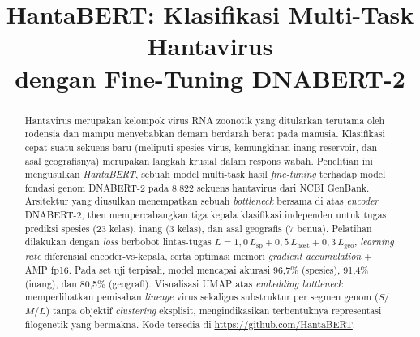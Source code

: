 \documentclass[conference]{IEEEtran}
\begin{document}
\title{HantaBERT: Klasifikasi Multi-Task Hantavirus\\dengan Fine-Tuning DNABERT-2}

\author{%
}

\maketitle

\begin{abstract}
Hantavirus merupakan kelompok virus RNA zoonotik yang ditularkan terutama
oleh rodensia dan mampu menyebabkan demam berdarah berat pada manusia.
Klasifikasi cepat suatu sekuens baru (meliputi spesies virus, kemungkinan
inang reservoir, dan asal geografisnya) merupakan langkah krusial dalam
respons wabah. Penelitian ini mengusulkan \emph{HantaBERT}, sebuah model
multi-task hasil \emph{fine-tuning} terhadap model fondasi genom
\textsc{DNABERT-2} pada 8.822 sekuens hantavirus dari NCBI GenBank.
Arsitektur yang diusulkan menempatkan sebuah \emph{bottleneck} bersama di
atas \emph{encoder} DNABERT-2, then mempercabangkan tiga kepala
klasifikasi independen untuk tugas prediksi spesies (23 kelas), inang
(3 kelas), dan asal geografis (7 benua). Pelatihan dilakukan dengan
\emph{loss} berbobot lintas-tugas $L = 1{,}0\,L_{\text{sp}} + 0{,}5\,L_{\text{host}}
+ 0{,}3\,L_{\text{geo}}$, \emph{learning rate} diferensial encoder-vs-kepala,
serta optimasi memori \emph{gradient accumulation} + AMP fp16. Pada set uji
terpisah, model mencapai akurasi 96{,}7\% (spesies), 91{,}4\% (inang), dan
80{,}5\% (geografi). Visualisasi UMAP atas \emph{embedding bottleneck}
memperlihatkan pemisahan \emph{lineage} virus sekaligus substruktur per
segmen genom ($S$/$M$/$L$) tanpa objektif \emph{clustering} eksplisit,
mengindikasikan terbentuknya representasi filogenetik yang bermakna.
Kode tersedia di \url{https://github.com/HantaBERT}.
\end{abstract}
\end{document}
